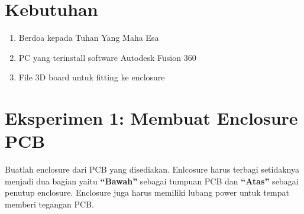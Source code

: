 \section{Kebutuhan}
\begin{enumerate}
    \item Berdoa kepada Tuhan Yang Maha Esa
    \item PC yang terinstall software Autodesk Fusion 360
    \item File 3D board untuk fitting ke enclosure
\end{enumerate}



\section{Eksperimen 1: Membuat Enclosure PCB}
Buatlah enclosure dari PCB yang disediakan. Enlcosure harus terbagi setidaknya menjadi dua bagian yaitu
\textbf{“Bawah”} sebagai tumpuan PCB dan \textbf{“Atas”} sebagai penutup enclosure. Enclosure juga harus memiliki
lubang power untuk tempat memberi tegangan PCB.

